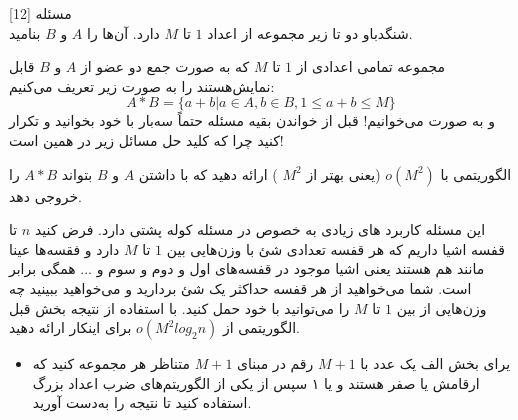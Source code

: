 ‌مسئله [12]
\\
شنگدباو دو تا زیر مجموعه از اعداد $1$ تا $M$ دارد. آن‌ها را $A$ و $B$ بنامید.

مجموعه تمامی اعدادی از $1$ تا $M$ که به صورت جمع دو عضو از $A$ و $B$ قابل نمایش‌هستند را به صورت زیر تعریف می‌کنیم:
$$A * B = \{a + b | a \in A , b \in B, 1 \le a + b \le M\}$$
و به صورت
می‌خوانیم! قبل از خواندن بقیه مسئله حتماً سه‌بار با خود بخوانید
و تکرار کنید چرا که کلید حل مسائل زیر در همین است!

الگوریتمی با 
$o(M^2)$
(یعنی بهتر از 
$M^2$
)
ارائه دهید که با داشتن $A$ و $B$ بتواند $A*B$ را خروجی دهد.

این مسئله کاربرد های زیادی به خصوص در مسئله کوله پشتی دارد. فرض کنید $n$ تا قفسه اشیا داریم که هر قفسه تعدادی شئ با وزن‌هایی بین $1$ تا $M$ دارد و فقسه‌ها عینا مانند هم هستند یعنی اشیا موجود در قفسه‌های اول و دوم و سوم و ... همگی برابر است. شما می‌خواهید از هر قفسه حداکثر یک شئ بردارید و می‌خواهید ببینید چه وزن‌هایی از بین $1$ تا $M$ را می‌توانید با خود حمل کنید. با استفاده از نتیجه بخش قبل الگوریتمی از
$o(M^2 log_2n)$
برای اینکار ارائه دهید.

\begin{itemize}
	\item[راهنمایی: ]
	یرای بخش الف یک عدد با $M+1$ رقم در مبنای $M+1$ متناظر هر مجموعه کنید که ارقامش یا صفر هستند و یا ۱ سپس از یکی از الگوریتم‌های ضرب اعداد بزرگ استفاده کنید تا نتیجه را به‌دست آورید.
\end{itemize}




